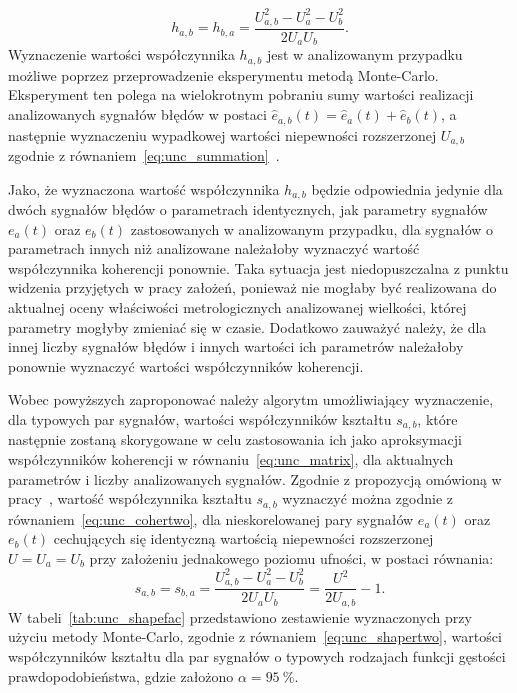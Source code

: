 \begin{equation}
h_{a,b} = h_{b,a} = \frac{U_{a,b}^{2} - U_{a}^{2} - U_{b}^{2}}{2 U_{a} U_{b}} \label{eq:unc_cohertwo}.
\end{equation}
Wyznaczenie wartości współczynnika $h_{a,b}$ jest w analizowanym przypadku możliwe poprzez przeprowadzenie eksperymentu metodą Monte-Carlo. Eksperyment ten polega na wielokrotnym pobraniu sumy wartości realizacji analizowanych sygnałów błędów w postaci $\hat{e}_{a,b}(t) = \hat{e}_{a}(t) + \hat{e}_{b}(t)$, a następnie wyznaczeniu wypadkowej wartości niepewności rozszerzonej $U_{a,b}$ zgodnie z równaniem~\eqref{eq:unc_summation}~\cite{jcgm_montecarlo}.

Jako, że wyznaczona wartość współczynnika $h_{a,b}$ będzie odpowiednia jedynie dla dwóch sygnałów błędów o parametrach identycznych, jak parametry sygnałów $e_{a}(t)$ oraz $e_{b}(t)$ zastosowanych w analizowanym przypadku, dla sygnałów o parametrach innych niż analizowane należałoby wyznaczyć wartość współczynnika koherencji ponownie. Taka sytuacja jest niedopuszczalna z punktu widzenia przyjętych w pracy założeń, ponieważ nie mogłaby być realizowana do aktualnej oceny właściwości metrologicznych analizowanej wielkości, której parametry mogłyby zmieniać się w czasie. Dodatkowo zauważyć należy, że dla innej liczby sygnałów błędów i innych wartości ich parametrów należałoby ponownie wyznaczyć wartości współczynników koherencji.

Wobec powyższych zaproponować należy algorytm umożliwiający wyznaczenie, dla typowych par sygnałów, wartości współczynników kształtu $s_{a,b}$, które następnie zostaną skorygowane w celu zastosowania ich jako aproksymacji współczynników koherencji w równaniu~\eqref{eq:unc_matrix}, dla aktualnych parametrów i liczby analizowanych sygnałów. Zgodnie z propozycją omówioną w pracy~\cite{jakubiec_model}, wartość współczynnika kształtu $s_{a,b}$ wyznaczyć można zgodnie z równaniem~\eqref{eq:unc_cohertwo}, dla nieskorelowanej pary sygnałów $e_{a}(t)$ oraz $e_{b}(t)$ cechujących się identyczną wartością niepewności rozszerzonej $U = U_{a} = U_{b}$ przy założeniu jednakowego poziomu ufności, w postaci równania:
\begin{equation}
s_{a,b} = s_{b,a} = \frac{U_{a,b}^{2} - U_{a}^{2} - U_{b}^{2}}{2 U_{a} U_{b}} = \frac{U^{2}}{2 U_{a,b}} - 1 \label{eq:unc_shapertwo}.
\end{equation}
W tabeli~\ref{tab:unc_shapefac} przedstawiono zestawienie wyznaczonych przy użyciu metody Monte-Carlo, zgodnie z równaniem~\eqref{eq:unc_shapertwo}, wartości współczynników kształtu dla par sygnałów o typowych rodzajach funkcji gęstości prawdopodobieństwa, gdzie założono $\alpha = \qty{95}{\percent}$.

